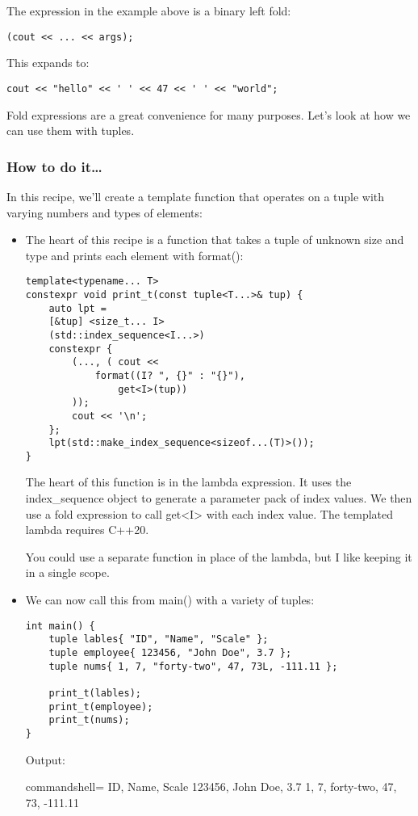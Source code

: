 The expression in the example above is a binary left fold:

\begin{lstlisting}[style=styleCXX]
(cout << ... << args);
\end{lstlisting}

This expands to:

\begin{lstlisting}[style=styleCXX]
cout << "hello" << ' ' << 47 << ' ' << "world";
\end{lstlisting}

Fold expressions are a great convenience for many purposes. Let's look at how we can use them with tuples.

\subsubsection{How to do it…}

In this recipe, we'll create a template function that operates on a tuple with varying numbers and types of elements:

\begin{itemize}
\item 
The heart of this recipe is a function that takes a tuple of unknown size and type and prints each element with format():

\begin{lstlisting}[style=styleCXX]
template<typename... T>
constexpr void print_t(const tuple<T...>& tup) {
	auto lpt =
	[&tup] <size_t... I>
	(std::index_sequence<I...>)
	constexpr {
		(..., ( cout <<
			format((I? ", {}" : "{}"),
				get<I>(tup))
		));
		cout << '\n';
	};
	lpt(std::make_index_sequence<sizeof...(T)>());
}
\end{lstlisting}

The heart of this function is in the lambda expression. It uses the index\_sequence object to generate a parameter pack of index values. We then use a fold expression to call get<I> with each index value. The templated lambda requires C++20.

You could use a separate function in place of the lambda, but I like keeping it in a single scope.

\item 
We can now call this from main() with a variety of tuples:

\begin{lstlisting}[style=styleCXX]
int main() {
	tuple lables{ "ID", "Name", "Scale" };
	tuple employee{ 123456, "John Doe", 3.7 };
	tuple nums{ 1, 7, "forty-two", 47, 73L, -111.11 };
	
	print_t(lables);
	print_t(employee);
	print_t(nums);
}
\end{lstlisting}

Output:

\begin{tcblisting}{commandshell={}}
ID, Name, Scale
123456, John Doe, 3.7
1, 7, forty-two, 47, 73, -111.11
\end{tcblisting}
\end{itemize}


